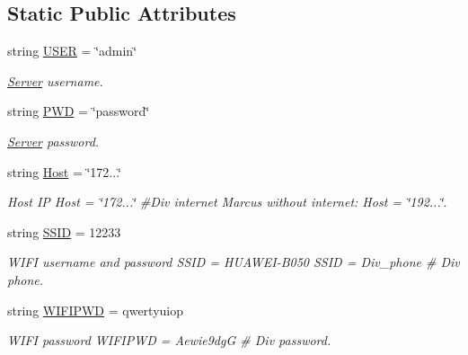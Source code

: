 \subsection*{Static Public Attributes}
\begin{DoxyCompactItemize}
\item 
string \mbox{\hyperlink{class_client___mosquitto_1_1_e_client_ab3f643099fbff5236c95590721aa5188}{U\+S\+ER}} = \char`\"{}admin\char`\"{}
\begin{DoxyCompactList}\small\item\em \mbox{\hyperlink{namespace_server}{Server}} username. \end{DoxyCompactList}\item 
string \mbox{\hyperlink{class_client___mosquitto_1_1_e_client_ad3cf4147566af0f38560371973639471}{P\+WD}} = \char`\"{}password\char`\"{}
\begin{DoxyCompactList}\small\item\em \mbox{\hyperlink{namespace_server}{Server}} password. \end{DoxyCompactList}\item 
string \mbox{\hyperlink{class_client___mosquitto_1_1_e_client_a8a284ffe41a54be27472fe09172e9373}{Host}} = \char`\"{}172...\char`\"{}
\begin{DoxyCompactList}\small\item\em Host IP Host = \char`\"{}172...\char`\"{} \#\+Div internet Marcus without internet\+: Host = \char`\"{}192...\char`\"{}. \end{DoxyCompactList}\item 
string \mbox{\hyperlink{class_client___mosquitto_1_1_e_client_a0ec7d46ddb557251f516db1647f2beae}{S\+S\+ID}} = \textquotesingle{}12233\textquotesingle{}
\begin{DoxyCompactList}\small\item\em W\+I\+FI username and password S\+S\+ID = \textquotesingle{}H\+U\+A\+W\+E\+I-\/\+B050\textquotesingle{} S\+S\+ID = \textquotesingle{}Div\+\_\+phone\textquotesingle{} \# Div phone. \end{DoxyCompactList}\item 
string \mbox{\hyperlink{class_client___mosquitto_1_1_e_client_a12f34b519c954e16d0595b2e499c2f99}{W\+I\+F\+I\+P\+WD}} = \textquotesingle{}qwertyuiop\textquotesingle{}
\begin{DoxyCompactList}\small\item\em W\+I\+FI password W\+I\+F\+I\+P\+WD = \textquotesingle{}Aewie9dgG\textquotesingle{} \# Div password. \end{DoxyCompactList}\item 

\end{DoxyCompactItemize}
